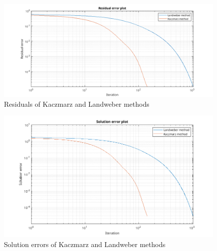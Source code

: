   \begin{figure}[H]
    \centering
    \includegraphics[width=1\textwidth]{images/Residuals_Problem2.png}
    \caption{Residuals of Kaczmarz and Landweber methods}
\end{figure}
\begin{figure}[H]
  \centering
  \includegraphics[width=1\textwidth]{images/Solution_Problem2.png}
  \caption{Solution errors of Kaczmarz and Landweber methods}
\end{figure}